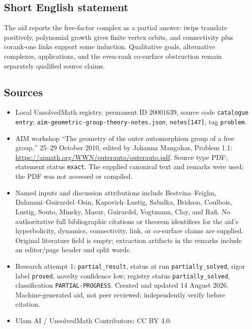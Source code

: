 \documentclass[11pt]{article}
\begin{document}
\subsection{Short English statement}
The aid reports the free-factor complex as a partial answer: iwips translate positively, polynomial growth gives finite vertex orbits, and connectivity plus corank-one links support some induction. Qualitative goals, alternative complexes, applications, and the even-rank co-surface obstruction remain separately qualified source claims.
\subsection{Sources}
\begin{itemize}
\item Local UnsolvedMath registry, permanent ID \(20001639\), source code \texttt{catalogue entry}; \texttt{aim-geometric-group-theory-notes.json}, \texttt{notes[147]}, tag \texttt{problem}.
\item AIM workshop ``The geometry of the outer automorphism group of a free group,'' 25--29 October 2010, edited by Johanna Mangahas, Problem 1.1: \url{https://aimath.org/WWN/outerauto/outerauto.pdf}. Source type PDF; statement status \texttt{exact}. The supplied canonical text and remarks were used; the PDF was not accessed or compiled.
\item Named inputs and discussion attributions include Bestvina--Feighn, Dahmani--Guirardel--Osin, Kapovich--Lustig, Sabalka, Bridson, Coulbois, Lustig, Souto, Minsky, Masur, Guirardel, Vogtmann, Clay, and Rafi. No authoritative full bibliographic citations or theorem identifiers for the aid's hyperbolicity, dynamics, connectivity, link, or co-surface claims are supplied. Original literature field is empty; extraction artifacts in the remarks include an editor/page header and split words.
\item Research attempt 1: \texttt{partial\_result}, status at run \texttt{partially\_solved}, rigor label \texttt{proved}, novelty confidence low; registry status \texttt{partially\_solved}, classification \texttt{PARTIAL-PROGRESS}. Created and updated 14 August 2026. Machine-generated aid, not peer reviewed; independently verify before citation.
\item Ulam AI / UnsolvedMath Contributors; CC BY 4.0.
\end{itemize}
\end{document}
